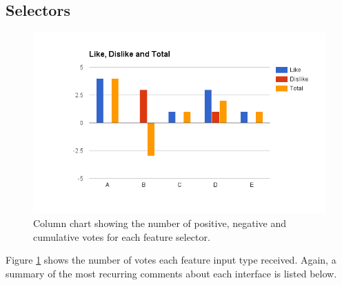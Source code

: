 \documentclass{mproj}
\begin{document}
\subsection*{Selectors}

\begin{figure}[h]
	\centering
	\includegraphics[trim=0cm 0cm 0cm 2cm, width=\textwidth]{images/selector_feedback}
	\caption{Column chart showing the number of positive, negative and cumulative votes for each feature selector.}
	\label{fig:selector_feedback}
\end{figure}

Figure \ref{fig:selector_feedback} shows the number of votes each feature input type received. Again, a summary of the most recurring comments about each interface is listed below.
\end{document}
